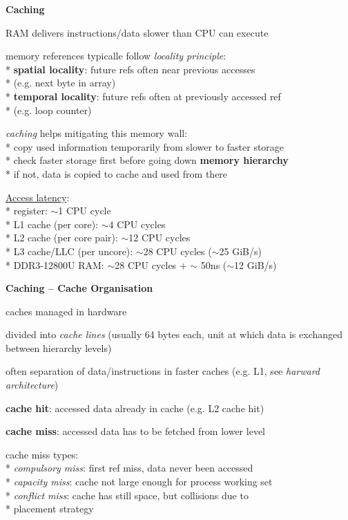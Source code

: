 \textbf{Caching}
\begin{items}
	\item RAM delivers instructions/data slower than CPU can execute
	\item memory references typicalle follow \emph{locality principle}: \\*
		\textbf{spatial locality}: future refs often near previous accesses \\*
			\phantom{x} (e.g. next byte in array) \\*
		\textbf{temporal locality}: future refs often at previously accessed ref \\*
			\phantom{x} (e.g. loop counter)
	\item \emph{caching} helps mitigating this memory wall: \\*
		copy used information temporarily from slower to faster storage \\*
		check faster storage first before going down \textbf{memory hierarchy} \\*
		if not, data is copied to cache and used from there
	\item \underline{Access latency}: \\*
		register: \( \sim \)1 CPU cycle \\*
		L1 cache (per core): \( \sim \)4 CPU cycles \\*
		L2 cache (per core pair): \( \sim \)12 CPU cycles \\*
		L3 cache/LLC (per uncore): \( \sim \)28 CPU cycles (\( \sim \)25 GiB/s) \\*
		DDR3-12800U RAM: \( \sim \)28 CPU cycles + \( \sim \) 50ns (\( \sim \)12 GiB/s)
\end{items}

\textbf{Caching -- Cache Organisation}
\begin{items}
	\item caches managed in hardware
	\item divided into \emph{cache lines} (usually 64 bytes each, unit at which data is exchanged between hierarchy levels)
	\item often separation of data/instructions in faster caches (e.g. L1, see \emph{harward architecture})
	\item \textbf{cache hit}: accessed data already in cache (e.g. L2 cache hit)
	\item \textbf{cache miss}: accessed data has to be fetched from lower level
	\item cache miss types: \\*
		\emph{compulsory miss}: first ref miss, data never been accessed \\*
		\emph{capacity miss}: cache not large enough for process working set \\*
		\emph{conflict miss}: cache has still space, but collisions due to \\* \phantom{x} placement strategy
\end{items}